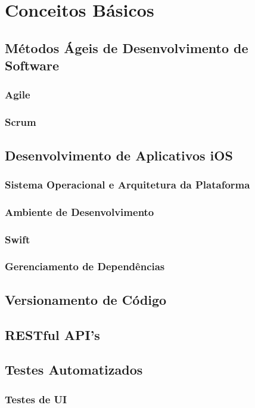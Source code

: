 \chapter{Conceitos Básicos}

\section{Métodos Ágeis de Desenvolvimento de Software}

\subsection{Agile}

\subsection{Scrum}

\section{Desenvolvimento de Aplicativos iOS}

\subsection{Sistema Operacional e Arquitetura da Plataforma}

\subsection{Ambiente de Desenvolvimento}

\subsection{Swift}

\subsection{Gerenciamento de Dependências}

\section{Versionamento de Código}

\section{RESTful API's}

\section{Testes Automatizados}
\subsection{Testes de UI}
